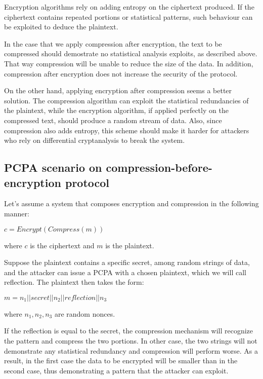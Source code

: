 Encryption algorithms rely on adding entropy on the ciphertext produced. If the ciphertext contains repeated portions or statistical patterns, such behaviour can be exploited to deduce the plaintext.

In the case that we apply compression after encryption, the text to be compressed should demostrate no statistical analysis exploits, as described above. That way compression will be unable to reduce the size of the data. In addition, compression after encryption does not increase the security of the protocol.

On the other hand, applying encryption after compression seems a better solution. The compression algorithm can exploit the statistical redundancies of the plaintext, while the encryption algorithm, if applied perfectly on the compressed text, should produce a random stream of data. Also, since compression also adds entropy, this scheme should make it harder for attackers who rely on differential cryptanalysis to break the system.

\subsection{PCPA scenario on compression-before-encryption protocol}

Let's assume a system that composes encryption and compression in the following manner:

\begin{math}c = Encrypt(Compress(m))\end{math}

where \begin{math}c\end{math} is the ciphertext and \begin{math}m\end{math} is the plaintext.

Suppose the plaintext contains a specific secret, among random strings of data, and the attacker can issue a PCPA with a chosen plaintext, which we will call reflection. The plaintext then takes the form:

\begin{math}m = n_1 || secret || n_2 || reflection || n_3\end{math}

where \begin{math}n_1, n_2, n_3\end{math} are random nonces.

If the reflection is equal to the secret, the compression mechanism will recognize the pattern and compress the two portions. In other case, the two strings will not demonstrate any statistical redundancy and compression will perform worse. As a result, in the first case the data to be encrypted will be smaller than in the second case, thus demonstrating a pattern that the attacker can exploit.

